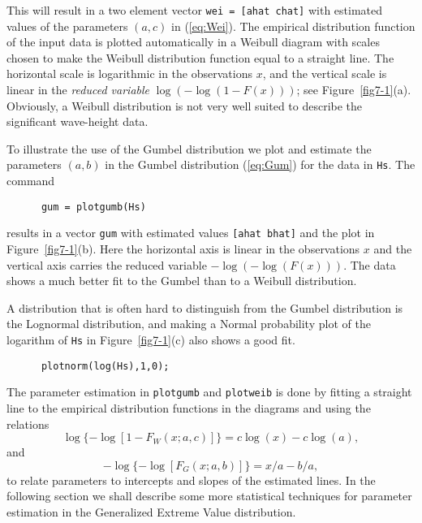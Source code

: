This will result in a two element vector {\tt wei = [ahat chat]} with
estimated values of the parameters $(a, c)$ in (\ref{eq:Wei}). The empirical
distribution function of the input data is plotted automatically in a
Weibull diagram with scales chosen to make the Weibull distribution function
equal to a straight line. The horizontal scale is logarithmic in the
observations $x$, and the vertical scale is linear in the {\em reduced
  variable} $\log (-\log (1 - F(x)))$;
see Figure~\ref{fig7-1}(a). Obviously, a Weibull distribution is
not very well suited to describe the significant wave-height data.

To illustrate the use of the Gumbel distribution we plot and estimate
the parameters $(a, b)$ in the Gumbel distribution (\ref{eq:Gum}) for the
data in {\tt Hs}. The command
{\small\begin{verbatim}
      gum = plotgumb(Hs)
\end{verbatim}}
\noindent
results in a vector {\tt gum} with estimated values
{\tt [ahat bhat]} and the plot in Figure~\ref{fig7-1}(b). Here the
horizontal axis is linear in the observations $x$ and the vertical
axis carries the reduced variable $- \log (- \log(F(x)))$. The data
shows a much better fit to the Gumbel than to a Weibull
distribution.

A distribution that is often hard to distinguish from
the Gumbel distribution is the Lognormal distribution, and making a
Normal probability plot of the logarithm of {\tt Hs} in
Figure~\ref{fig7-1}(c) also shows a good fit.
{\small\begin{verbatim}
      plotnorm(log(Hs),1,0);
\end{verbatim}}

The parameter estimation in {\tt plotgumb} and {\tt plotweib} is done
by fitting a straight line to the empirical distribution functions in
the diagrams and using the relations
\begin{equation}
  \log\{-\log[1-F_{W}(x;a,c)]\}=c\log(x)-c\log(a),
\end{equation}
and
\begin{equation}
  -\log\{-\log[F_{G}(x;a,b)]\}=x/a-b/a,
\end{equation}
to relate parameters to intercepts and slopes of the estimated lines.
In the following section we shall describe some more statistical
techniques for parameter estimation in the Generalized Extreme Value
distribution.

